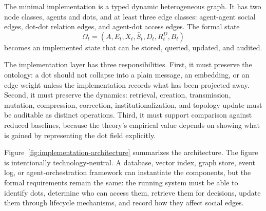 \documentclass[11pt]{article}
\theoremstyle{remark}
\begin{document}
The minimal implementation is a typed dynamic heterogeneous graph. It has
two node classes, agents and dots, and at least three edge classes:
agent-agent social edges, dot-dot relation edges, and agent-dot access
edges. The formal state
$$
\Omega_t=(A,E_t,X_t,\bar S_t,D_t,R_t^D,B_t)
$$
becomes an implemented state that can be stored, queried, updated, and
audited.


The implementation layer has three responsibilities. First, it must preserve the ontology: a dot should not collapse into a plain message, an embedding, or an edge weight unless the implementation records what has been projected away. Second, it must preserve the dynamics: retrieval, creation, transmission, mutation, compression, correction, institutionalization, and topology update must be auditable as distinct operations. Third, it must support comparison against reduced baselines, because the theory's empirical value depends on showing what is gained by representing the dot field explicitly.

Figure~\ref{fig:implementation-architecture} summarizes the architecture. The figure is intentionally technology-neutral. A database, vector index, graph store, event log, or agent-orchestration framework can instantiate the components, but the formal requirements remain the same: the running system must be able to identify dots, determine who can access them, retrieve them for decisions, update them through lifecycle mechanisms, and record how they affect social edges.
\end{document}
